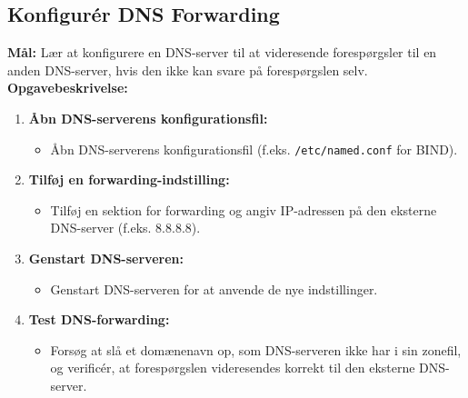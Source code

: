 \subsection{Konfigurér DNS Forwarding}
\textbf{Mål:} Lær at konfigurere en DNS-server til at videresende forespørgsler til en anden DNS-server, hvis den ikke kan svare på forespørgslen selv.
\newline\newline\noindent
\textbf{Opgavebeskrivelse:}
\begin{enumerate}
	\item \textbf{Åbn DNS-serverens konfigurationsfil:}
	\begin{itemize}
		\item Åbn DNS-serverens konfigurationsfil (f.eks. \texttt{/etc/named.conf} for BIND).
	\end{itemize}
	\item \textbf{Tilføj en forwarding-indstilling:}
	\begin{itemize}
		\item Tilføj en sektion for forwarding og angiv IP-adressen på den eksterne DNS-server (f.eks. 8.8.8.8).
	\end{itemize}
	\item \textbf{Genstart DNS-serveren:}
	\begin{itemize}
		\item Genstart DNS-serveren for at anvende de nye indstillinger.
	\end{itemize}
	\item \textbf{Test DNS-forwarding:}
	\begin{itemize}
		\item Forsøg at slå et domænenavn op, som DNS-serveren ikke har i sin zonefil, og verificér, at forespørgslen videresendes korrekt til den eksterne DNS-server.
	\end{itemize}
\end{enumerate}

